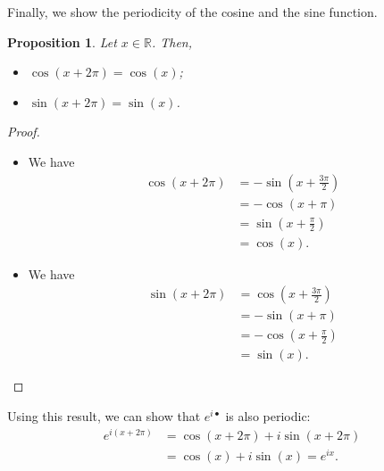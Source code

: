 \documentclass[a4paper, openany]{memoir}
\theoremstyle{definition}
\theoremstyle{plain}
\newtheorem{proposition}[definition]{Proposition}
\begin{document}
\noindent Finally, we show the periodicity of the cosine and the sine function.
\begin{proposition}
Let $x \in \mathbb{R}$. Then, 
\begin{itemize}
    \item $\cos(x + 2\pi) = \cos (x)$;
    \item $\sin(x + 2\pi) = \sin(x)$. 
\end{itemize}
\end{proposition}
\begin{proof}
\hspace*{0pt}
\begin{itemize}
    \item We have
    \begin{align*}
        \cos (x + 2\pi) &= -\sin (x + \tfrac{3\pi}{2}) \\
        &= -\cos (x + \pi) \\
        &= \sin (x + \tfrac{\pi}{2}) \\
        &= \cos (x).
    \end{align*}
    
    \item We have
    \begin{align*}
        \sin (x + 2\pi) &= \cos (x + \tfrac{3\pi}{2}) \\
        &= -\sin (x + \pi) \\
        &= -\cos (x + \tfrac{\pi}{2}) \\
        &= \sin (x).
    \end{align*}
\end{itemize}
\end{proof}
\noindent Using this result, we can show that $e^{i \bullet}$ is also periodic:
\begin{align*}
    e^{i(x + 2\pi)} &= \cos(x + 2\pi) + i \sin(x + 2\pi) \\
    &= \cos(x) + i \sin(x) = e^{ix}.
\end{align*}
\end{document}
